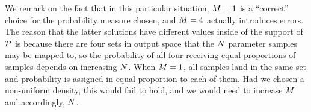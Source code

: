 We remark on the fact that in this particular situation, $M = 1$ is a ``correct'' choice for the probability measure chosen, and $M = 4$ actually introduces errors.
The reason that the latter solutions have different values inside of the support of $\mathcal{P}$ is because there are four sets in output space that the $N$ parameter samples may be mapped to, so the probability of all four receiving equal proportions of samples depends on increasing $N$.
When $M = 1$, all samples land in the same set and probability is assigned in equal proportion to each of them.
Had we chosen a non-uniform density, this would fail to hold, and we would need to increase $M$ and accordingly, $N$.
